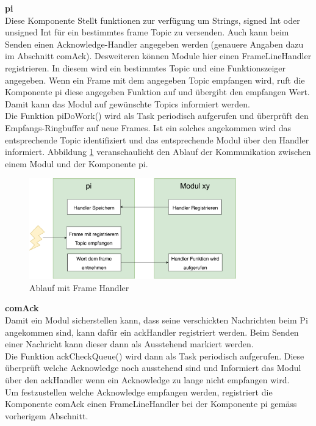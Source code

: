 \documentclass[../../main.tex]{subfiles}
\begin{document}
    \textbf{pi}\\
    Diese Komponente Stellt funktionen zur verfügung um Strings, signed Int oder unsigned Int für ein bestimmtes frame Topic zu versenden. Auch kann beim Senden einen Acknowledge-Handler angegeben werden (genauere Angaben dazu im Abschnitt comAck). Desweiteren können Module hier einen FrameLineHandler registrieren. In diesem wird ein bestimmtes Topic und eine Funktionszeiger angegeben. Wenn ein Frame mit dem angegeben Topic empfangen wird, ruft die Komponente pi diese angegeben Funktion auf und übergibt den empfangen Wert. Damit kann das Modul auf gewünschte Topics informiert werden.\\
    Die Funktion piDoWork() wird als Task periodisch aufgerufen und überprüft den Empfangs-Ringbuffer auf neue Frames. Ist ein solches angekommen wird das entsprechende Topic identifiziert und das entsprechende Modul über den Handler informiert. Abbildung \ref{fig:et_com_pi_handler} veranschaulicht den Ablauf der Kommunikation zwischen einem Modul und der Komponente pi.

    
    \begin{figure}[H]
        \centering
        \includegraphics[width=0.8\textwidth]{../../images/et/et_com_pi_handler.pdf}
        \caption {Ablauf mit Frame Handler}
        \label{fig:et_com_pi_handler}
    \end{figure}

    \textbf{comAck}\\
    Damit ein Modul sicherstellen kann, dass seine verschickten Nachrichten beim Pi angekommen sind, kann dafür ein ackHandler registriert werden. Beim Senden einer Nachricht kann dieser dann als Ausstehend markiert werden. \\
    Die Funktion ackCheckQueue() wird dann als Task periodisch aufgerufen. Diese überprüft welche Acknowledge noch ausstehend sind und Informiert das Modul über den ackHandler wenn ein Acknowledge zu lange nicht empfangen wird.\\
    Um festzustellen welche Acknowledge empfangen werden, registriert die Komponente comAck einen FrameLineHandler bei der Komponente pi gemäss vorherigem Abschnitt.\\
\end{document}
